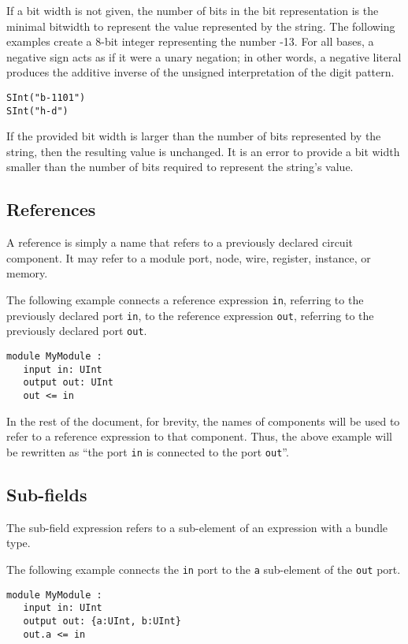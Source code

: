 \documentclass[12pt]{article}
\begin{document}
If a bit width is not given, the number of bits in the bit representation is the minimal bitwidth to represent the value represented by the string. The following examples create a 8-bit integer representing the number -13. For all bases, a negative sign acts as if it were a unary negation; in other words, a negative literal produces the additive inverse of the unsigned interpretation of the digit pattern.
\begin{lstlisting}
SInt("b-1101")
SInt("h-d")
\end{lstlisting}

If the provided bit width is larger than the number of bits represented by the string, then the resulting value is unchanged.
It is an error to provide a bit width smaller than the number of bits required to represent the string's value.

\subsection{References}
A reference is simply a name that refers to a previously declared circuit component. It may refer to a module port, node, wire, register, instance, or memory.

The following example connects a reference expression \verb|in|, referring to the previously declared port \verb|in|, to the reference expression \verb|out|, referring to the previously declared port \verb|out|.

\begin{lstlisting}
module MyModule :
   input in: UInt
   output out: UInt
   out <= in
\end{lstlisting}

In the rest of the document, for brevity, the names of components will be used to refer to a reference expression to that component. Thus, the above example will be rewritten as ``the port \verb|in| is connected to the port \verb|out|''.

\subsection{Sub-fields}\label{subfields}
The sub-field expression refers to a sub-element of an expression with a bundle type.

The following example connects the \verb|in| port to the \verb|a| sub-element of the \verb|out| port.
\begin{lstlisting}
module MyModule :
   input in: UInt
   output out: {a:UInt, b:UInt}
   out.a <= in
\end{lstlisting}
\end{document}
